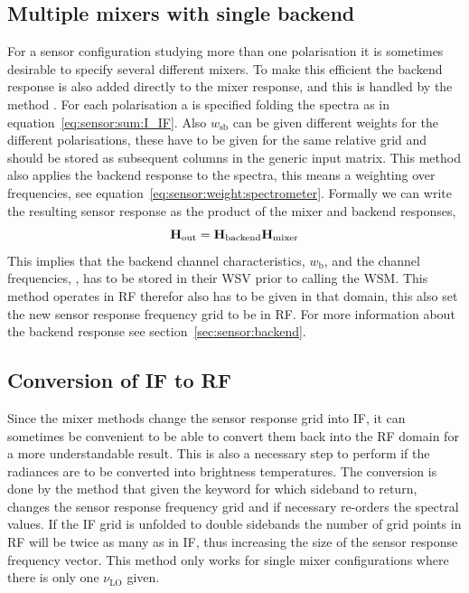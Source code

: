 \subsection{Multiple mixers with single backend}
For a sensor configuration studying more than one polarisation it is sometimes desirable to specify several different mixers. To make this efficient the backend response is also added directly to the mixer response, and this is handled by the method . For each polarisation a  is specified folding the spectra as in equation~\ref{eq:sensor:sum:I_IF}. Also $w_\mathrm{sb}$ can be given different weights for the different polarisations, these have to be given for the same relative grid and should be stored as subsequent columns in the generic input matrix.
This method also applies the backend response to the spectra, this means a weighting over frequencies, see equation~\ref{eq:sensor:weight:spectrometer}. Formally we can write the resulting sensor response as the product of the mixer and backend responses,
\begin{equation}
\mathbf{H}_{\mathrm{out}} = \mathbf{H}_{\mathrm{backend}} \mathbf{H}_{\mathrm{mixer}}
\end{equation}
This implies that the backend channel characteristics, $w_\mathrm{b}$, and the channel frequencies, , has to be stored in their WSV prior to calling the WSM. This method operates in RF therefor  also has to be given in that domain, this also set the new sensor response frequency grid to be in RF. For more information about the backend response see section~\ref{sec:sensor:backend}.

\subsection{Conversion of IF to RF}
Since the mixer methods change the sensor response grid into IF, it can sometimes be convenient to be able to convert them back into the RF domain for a more understandable result. This is also a necessary step to perform if the radiances are to be converted into brightness temperatures. The conversion is done by the method  that given the keyword for which sideband to return, changes the sensor response frequency grid and if necessary re-orders the spectral values. If the IF grid is unfolded to double sidebands the number of grid points in RF will be twice as many as in IF, thus increasing the size of the sensor response frequency vector. This method only works for single mixer configurations where there is only one $\nu_\mathrm{LO}$ given.


